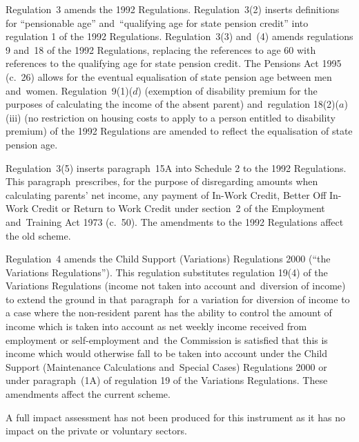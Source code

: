 \documentclass[12pt,a4paper]{article}
\begin{document}
Regulation~3 amends the 1992 Regulations. Regulation~3(2) inserts definitions for “pensionable age” and~“qualifying age for state pension credit” into regulation 1 of the 1992 Regulations. Regulation~3(3) and~(4) amends regulations 9 and~18 of the 1992 Regulations, replacing the references to age 60 with references to the qualifying age for state pension credit. The Pensions Act 1995 (c.~26) allows for the eventual equalisation of state pension age between men and~women. Regulation~9(1)($d$)  (exemption of disability premium for the purposes of calculating the income of the absent parent) and~regulation 18(2)($a$)(iii) (no restriction on housing costs to apply to a person entitled to disability premium) of the 1992 Regulations are amended to reflect the equalisation of state pension age.

Regulation~3(5) inserts paragraph~15A into Schedule 2 to the 1992 Regulations. This paragraph~prescribes, for the purpose of disregarding amounts when calculating parents’ net income, any payment of In-Work Credit, Better Off In-Work Credit or Return to Work Credit under section~2 of the Employment and~Training Act 1973 (c.~50). The amendments to the 1992 Regulations affect the old scheme.

Regulation~4 amends the Child Support (Variations) Regulations 2000 (“the Variations Regulations”). This regulation substitutes regulation 19(4) of the Variations Regulations (income not taken into account and~diversion of income) to extend the ground in that paragraph~for a variation for diversion of income to a case where the non-resident parent has the ability to control the amount of income which is taken into account as net weekly income received from employment or self-employment and~the Commission is satisfied that this is income which would otherwise fall to be taken into account under the Child Support (Maintenance Calculations and~Special Cases) Regulations 2000 or under paragraph~(1A) of regulation 19 of the Variations Regulations. These amendments affect the current scheme.

A full impact assessment has not been produced for this instrument as it has no impact on the private or voluntary sectors. 
\end{document}
